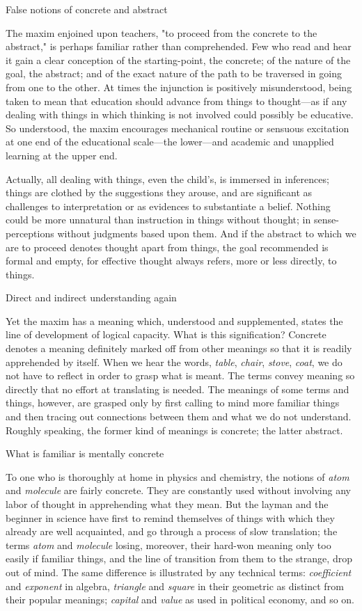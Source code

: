 \documentclass[letterpaper]{book}
\begin{document}
False notions of concrete and abstract

The maxim enjoined upon teachers, "to proceed from the concrete to the
abstract," is perhaps familiar rather than comprehended. Few who read
and hear it gain a clear conception of the starting-point, the concrete;
of the nature of the goal, the abstract; and of the exact nature of the
path to be traversed in going from one to the other. At times the
injunction is positively misunderstood, being taken to mean that
education should advance from things to thought---as if any dealing with
things in which thinking is not involved could possibly be educative. So
understood, the maxim encourages mechanical routine or sensuous
excitation at one end of the educational scale---the lower---and
academic and unapplied learning at the upper end.

Actually, all dealing with things, even the child's, is immersed in
inferences; things are clothed by the suggestions they arouse, and are
significant as challenges to interpretation or as evidences to
substantiate a belief. Nothing could be more unnatural than instruction
in things without thought; in sense-perceptions without judgments based
upon them. And if the abstract to which we are to proceed denotes
thought apart from things, the goal recommended is formal
and
empty, for effective thought always refers, more or less directly, to
things.

Direct and indirect understanding again

Yet the maxim has a meaning which, understood and supplemented, states
the line of development of logical capacity. What is this signification?
Concrete denotes a meaning definitely marked off from other meanings so
that it is readily apprehended by itself. When we hear the words,
\emph{table}, \emph{chair}, \emph{stove}, \emph{coat}, we do not have to
reflect in order to grasp what is meant. The terms convey meaning so
directly that no effort at translating is needed. The meanings of some
terms and things, however, are grasped only by first calling to mind
more familiar things and then tracing out connections between them and
what we do not understand. Roughly speaking, the former kind of meanings
is concrete; the latter abstract.

What is familiar is mentally concrete

To one who is thoroughly at home in physics and chemistry, the notions
of \emph{atom} and \emph{molecule} are fairly concrete. They are
constantly used without involving any labor of thought in apprehending
what they mean. But the layman and the beginner in science have first to
remind themselves of things with which they already are well acquainted,
and go through a process of slow translation; the terms \emph{atom} and
\emph{molecule} losing, moreover, their hard-won meaning only too easily
if familiar things, and the line of transition from them to the strange,
drop out of mind. The same difference is illustrated by any technical
terms: \emph{coefficient} and \emph{exponent} in algebra,
\emph{triangle} and \emph{square} in their geometric as distinct from
their popular meanings; \emph{capital} and \emph{value} as used in
political economy, and so on.
\end{document}
